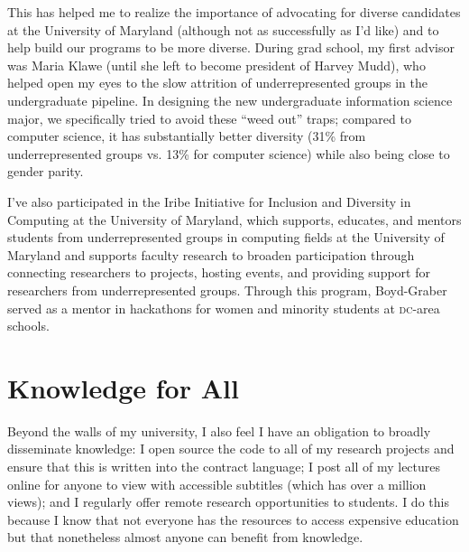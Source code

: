 \documentclass[11pt]{amsart}
\newcommand{\abr}[1]{\textsc{#1}}
\begin{document}
This has helped me to realize the importance of advocating for diverse
candidates at the University of Maryland (although not as successfully
as I'd like) and to help build our programs to be more diverse.
%
During grad school, my first advisor was Maria Klawe (until she left
to become president of Harvey Mudd), who helped open my eyes to the
slow attrition of underrepresented groups in the undergraduate
pipeline.
%
In designing the new undergraduate information science major, we
specifically tried to avoid these ``weed out'' traps; compared to
computer science, it has substantially better diversity (31\% from
underrepresented groups vs. 13\% for computer science) while also
being close to gender parity.

I've also participated in the Iribe Initiative for Inclusion and Diversity
in Computing at the University of Maryland, which supports, educates,
and mentors students from underrepresented groups in computing fields
at the University of Maryland and supports faculty research to broaden
participation through connecting researchers to projects, hosting
events, and providing support for researchers from underrepresented
groups.
%
Through this program, Boyd-Graber served as a mentor in hackathons for
women and minority students at \abr{dc}-area schools.

\section{Knowledge for All}

Beyond the walls of my university, I also feel I have an obligation to
broadly disseminate knowledge: I open source the code to all of my
research projects and ensure that this is written into the contract
language; I post all of my lectures online for anyone to view with
accessible subtitles (which has over a million views); and I regularly
offer remote research opportunities to students.
%
I do this because I know that not everyone has the resources to access
expensive education but that nonetheless almost anyone can benefit
from knowledge.




%
%
\end{document}
